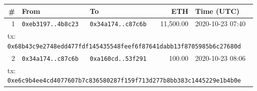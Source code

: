 {\scriptsize\begin{longtable}{r p{2.9cm} p{2.9cm} r p{2.5cm}}\toprule
\textbf{\#} & \textbf{From} & \textbf{To} & \textbf{ETH} & \textbf{Time (UTC)}\\\midrule\endhead
1 & \texttt{0xeb3197..4b8c23} & \texttt{0x34a174..c87c6b} & 11,500.00 & 2020-10-23 07:40\\
\multicolumn{5}{l}{\quad tx: \texttt{0x68b43c9e2748edd477fdf145435548feef6f87641dabb13f8705985b6c27680d}}\\
2 & \texttt{0x34a174..c87c6b} & \texttt{0xa160cd..53f291} & 100.00 & 2020-10-23 08:06\\
\multicolumn{5}{l}{\quad tx: \texttt{0xe6c9b4ee4cd4077607b7c836580287f159f713d277b8bb383c1445229e1b4b0e}}\\
\bottomrule\end{longtable}}
